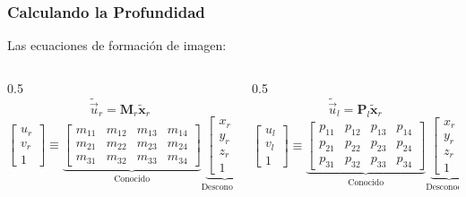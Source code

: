 \begin{frame}
    \frametitle{Calculando la Profundidad}
    Las ecuaciones de formación de imagen:

    \begin{columns}
        \begin{column}{0.5\textwidth}
            \begin{equation*}
                \tilde{\vec{u}}_r = \mathbf{M}_r \tilde{\mathbf{x}}_r
            \end{equation*}
            \begin{equation*}
                \begin{bmatrix} u_r \\ v_r \\ 1 \end{bmatrix} \equiv
                \underbrace{\begin{bmatrix}
                    m_{11} & m_{12} & m_{13} & m_{14} \\
                    m_{21} & m_{22} & m_{23} & m_{24} \\
                    m_{31} & m_{32} & m_{33} & m_{34}
                \end{bmatrix}}_{\text{Conocido}}
                \underbrace{\begin{bmatrix} x_r \\ y_r \\ z_r \\ 1 \end{bmatrix}}_{\text{Desconocido}}
            \end{equation*}
        \end{column}
        \begin{column}{0.5\textwidth}
            \begin{equation*}
                \tilde{\vec{u}}_l = \mathbf{P}_l \tilde{\mathbf{x}}_r
            \end{equation*}
            \begin{equation*}
                \begin{bmatrix} u_l \\ v_l \\ 1 \end{bmatrix} \equiv
                \underbrace{\begin{bmatrix}
                    p_{11} & p_{12} & p_{13} & p_{14} \\
                    p_{21} & p_{22} & p_{23} & p_{24} \\
                    p_{31} & p_{32} & p_{33} & p_{34}
                \end{bmatrix}}_{\text{Conocido}}
                \underbrace{\begin{bmatrix} x_r \\ y_r \\ z_r \\ 1 \end{bmatrix}}_{\text{Desconocido}}
            \end{equation*}
        \end{column}
    \end{columns}


\end{frame}
